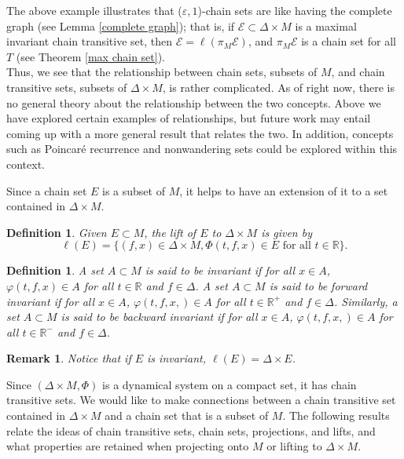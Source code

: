 \documentclass[11pt]{article}
\newtheorem{defn}[thm]{Definition}
\newtheorem{remark}[thm]{Remark}
\begin{document}
The above example illustrates that ($\varepsilon,1$)-chain sets are like having the complete graph (see Lemma \ref{complete graph}); that is, if $\mathcal{E}\subset \Delta\times M$ is a maximal invariant chain transitive set, then $\mathcal{E}=\ell(\pi_M\mathcal{E})$, and $\pi_M\mathcal{E}$ is a chain set for all $T$ (see Theorem \ref{max chain set}).\\
\indent Thus, we see that the relationship between chain sets, subsets of $M$, and chain transitive sets, subsets of $\Delta\times M$, is rather complicated. As of right now, there is no general theory about the relationship between the two concepts.  Above we have explored certain examples of relationships, but future work may entail coming up with a more general result that relates the two.  In addition, concepts such as Poincar\'e recurrence and nonwandering sets could be explored within this context.  

\indent Since a chain set $E$ is a subset of $M$, it helps to have an extension of it to a set contained in $\Delta\times M$. 

\begin{defn}
Given $E\subset M$, the lift of $E$ to $\Delta\times M$ is given by
$$\ell(E)=\{(f,x)\in \Delta\times M,\Phi(t,f,x)\in E \text{ for all }t\in\mathbb{R}\}.$$
\end{defn}

\begin{defn}
A set $A\subset M$ is said to be invariant if for all $x\in A$, $\varphi(t,f,x)\in A$ for all $t\in\mathbb{R}$ and $f\in\Delta$.
A set $A\subset M$ is said to be forward invariant if for all $x\in A$, $\varphi(t,f,x,)\in A$ for all $t\in \mathbb{R}^+$ and $f\in\Delta$.  Similarly, a set $A\subset M$ is said to be backward invariant if for all $x\in A$, $\varphi(t,f,x,)\in A$ for all $t\in \mathbb{R}^-$ and $f\in\Delta$.
\end{defn}


\begin{remark}
Notice that if $E$ is invariant, $\ell(E)=\Delta\times E$. 
\end{remark}

Since $(\Delta\times M,\Phi)$ is a dynamical system on a compact set, it has chain transitive sets.  We would like to make connections between a chain transitive set contained in $\Delta\times M$ and a chain set that is a subset of $M$.  The following results relate the ideas of chain transitive sets, chain sets, projections, and lifts, and what properties are retained when projecting onto $M$ or lifting to $\Delta\times M$. 
\end{document}
